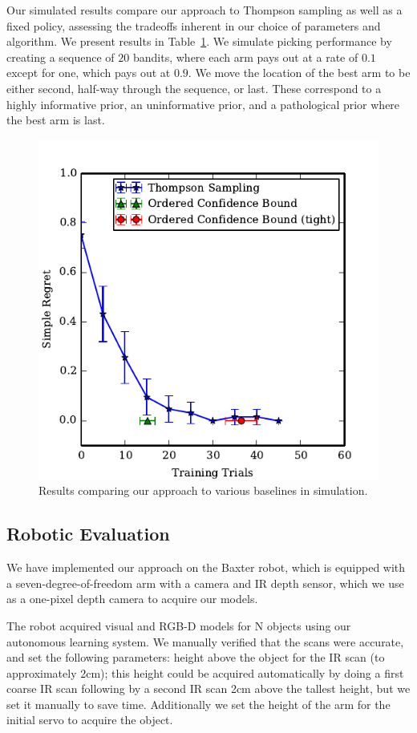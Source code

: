 \documentclass{article}
\begin{document}
Our simulated results compare our approach to Thompson sampling as
well as a fixed policy, assessing the tradeoffs inherent in our choice
of parameters and algorithm.  We present results in
Table~\ref{fig:simulation_results}.  We simulate picking performance
by creating a sequence of $20$ bandits, where each arm pays out at a
rate of $0.1$ except for one, which pays out at $0.9$.  We move the
location of the best arm to be either second, half-way through the
sequence, or last.  These correspond to a highly informative prior, an
uninformative prior, and a pathological prior where the best arm is
last.
\begin{figure}
\includegraphics{figures/bestarm.pdf}
\caption{Results comparing our approach to various baselines in simulation.\label{fig:simulation_results}}
\end{figure}


\subsection{Robotic Evaluation}
 We have implemented our approach on the Baxter
robot, which is equipped with a seven-degree-of-freedom arm with a
camera and IR depth sensor, which we use as a one-pixel depth camera
to acquire our models.

The robot acquired visual and RGB-D models for N objects using our
autonomous learning system.  We manually verified that the scans were
accurate, and set the following parameters: height above the object
for the IR scan (to approximately 2cm); this height could be acquired
automatically by doing a first coarse IR scan following by a second IR
scan 2cm above the tallest height, but we set it manually to save
time.  Additionally we set the height of the arm for the initial servo
to acquire the object.
\end{document}
